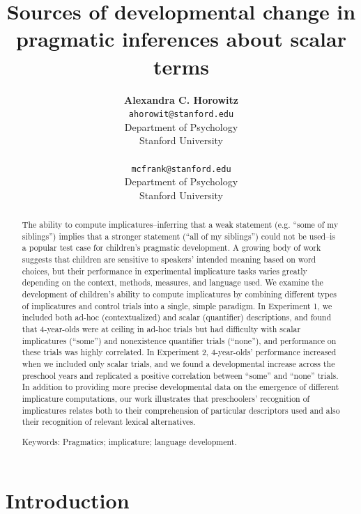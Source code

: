 \documentclass[10pt,letterpaper]{article}
\title{Sources of developmental change in pragmatic inferences about scalar terms}
\author{{\large \bf Alexandra C. Horowitz} \\ \texttt{ahorowit@stanford.edu}\\ Department of Psychology \\ Stanford University \\ 
\And {\large \bf Michael C. Frank} \\ \texttt{mcfrank@stanford.edu} \\ Department of Psychology \\ Stanford University \\ }
\begin{document}
\maketitle

\begin{abstract} 

The ability to compute implicatures--inferring that a weak statement (e.g. ``some of my siblings'') implies that a stronger statement (``all of my siblings'') could not be used--is a popular test case for children's pragmatic development. A growing body of work suggests that children are sensitive to speakers' intended meaning based on word choices, but their performance in experimental implicature tasks varies greatly depending on the context, methods, measures, and language used. We examine the development of children's ability to compute implicatures by combining different types of implicatures and control trials into a single, simple paradigm. In Experiment 1, we included both ad-hoc (contextualized) and scalar (quantifier) descriptions, and found that 4-year-olds were at ceiling in ad-hoc trials but had difficulty with scalar implicatures (``some'') and nonexistence quantifier trials (``none''), and performance on these trials was highly correlated.  In Experiment 2, 4-year-olds' performance increased when we included only scalar trials, and we found a developmental increase across the preschool years and replicated a positive correlation between ``some'' and ``none'' trials. In addition to providing more precise developmental data on the emergence of different implicature computations, our work illustrates that preschoolers' recognition of implicatures relates both to their comprehension of particular descriptors used and also their recognition of relevant lexical alternatives. 




{Keywords:} Pragmatics; implicature; language development. 
\end{abstract}

\section{Introduction}
\end{document}
